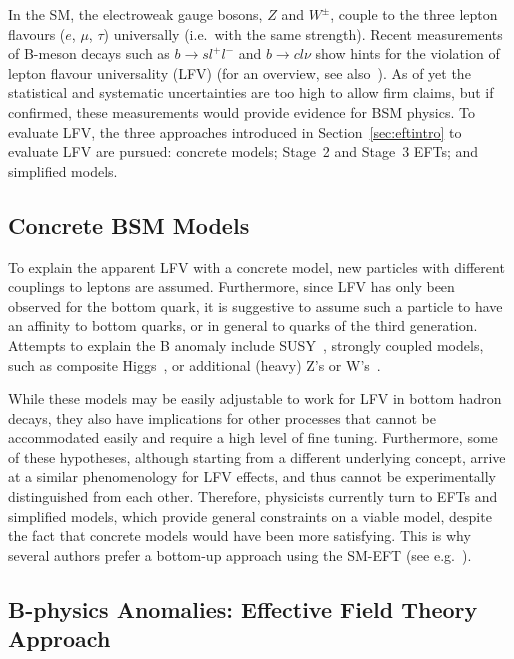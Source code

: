 In the SM, the electroweak gauge bosons, $Z$ and $W^\pm$, couple to
the three lepton flavours ($e$, $\mu$, $\tau$) universally (i.e.\ with
the same strength).  Recent measurements of B-meson decays such as
$b \to sl^+l^-$ and $b \to c l \nu$ show hints for the violation of
lepton flavour universality (LFV) (for an overview, see
also~\citep{Albrecht:2018frt}).  As of yet the statistical and systematic
uncertainties are too high to allow firm claims, but if confirmed,
these measurements would provide evidence for BSM physics. To evaluate
LFV, the three approaches introduced in
Section~\ref{sec:eftintro} to evaluate LFV are pursued: concrete
models; Stage~2 and Stage~3 EFTs; and
simplified models. 

\subsection{Concrete BSM Models}
\label{sec:B-con-BSM}

To explain the apparent LFV with a concrete model, new particles with
different couplings to leptons are assumed.  Furthermore, since LFV
has only been observed for the bottom quark, it is suggestive to
assume such a particle to have an affinity to bottom quarks, or in
general to quarks of the third generation.  Attempts to explain the B
anomaly include SUSY~\citep{Altmannshofer:2017poe}, strongly
coupled models, such as composite Higgs~\citep{Greljo:2015mma}, or
additional (heavy) Z's or W's~\citep{Boucenna:2016qad}.

While these models may be easily adjustable to work for LFV in 
bottom hadron decays, they also have implications for other processes
that cannot be accommodated easily and require a high level of fine
tuning. Furthermore, some of these hypotheses, although starting from
a different underlying concept, arrive at a similar phenomenology for 
LFV effects, and thus cannot be experimentally distinguished from each other. Therefore, physicists currently turn to EFTs and simplified models, which
provide general constraints on a viable model, %
despite the fact that concrete models would have been more satisfying.
This is why several authors prefer a bottom-up approach using the
SM-EFT (see e.g.~\citet{Buttazzo:2017ixm}).

\subsection{B-physics Anomalies: Effective Field Theory Approach}\label{sec:Bphysics}

